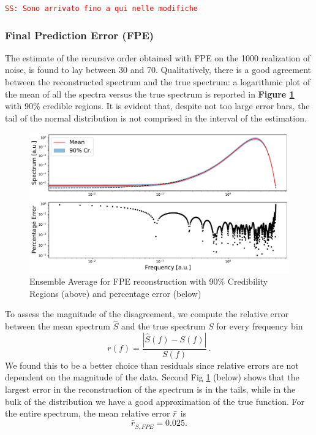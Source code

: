 \documentclass[twocolumn,showpacs,preprintnumbers,nofootinbib,prd,
superscriptaddress,10pt]{revtex4-1}
\newcommand{\sschmidt}[1]{{\textcolor{red}{\texttt{SS: #1}} }}
\begin{document}
\sschmidt{Sono arrivato fino a qui nelle modifiche}

\subsubsection{Final Prediction Error (FPE)}
The estimate of the recursive order obtained with FPE on the 1000 realization of noise, is found to lay between 30 and 70. Qualitatively, there is a good agreement between the reconstructed spectrum and the true spectrum: a logarithmic plot of the mean of all the spectra versus the true spectrum is reported in \textbf{Figure \ref{fig:FPEmean}} with 90\% credible regions. It is evident that, despite not too large error bars, the tail of the normal distribution is not comprised in the interval of the estimation. 
\begin{figure}[H]
    \centering
    \includegraphics[width = \linewidth]{Images/NormalPSD/FPEpsdAndResiduals.pdf}
    \caption{Ensemble Average for FPE reconstruction with 90\% Credibility Regions (above) and percentage error (below)}
    \label{fig:FPEmean}
\end{figure}
To assess the magnitude of the disagreement, we compute the relative error between the mean spectrum $\hat{S}$ and the true spectrum $S$ for every frequency bin
\begin{equation}
    \nonumber
    r(f) = \frac{|\hat{S}(f) - S(f)|}{S(f)}\,.
\end{equation}
We found this to be a better choice than residuals since relative errors are not dependent on the magnitude of the data. Second Fig \ref{fig:FPEmean} (below) shows that the largest error in the reconstruction of the spectrum is in the tails, while in the bulk of the distribution we have a good approximation of the true function. 
For the entire spectrum, the mean relative error $\Bar{r}$ is 
\begin{equation}
    \nonumber
    \bar{r}_{\bar S, FPE} = 0.025.
\end{equation}
\end{document}
